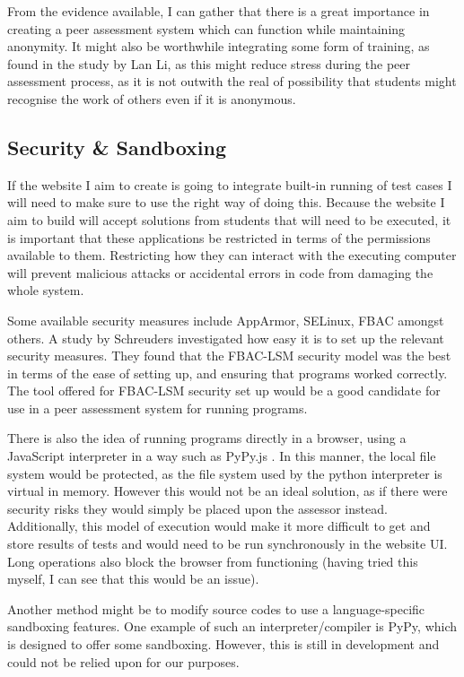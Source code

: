 \documentclass[a4paper,11pt]{report}
\begin{document}
From the evidence available, I can gather that there is a great importance in creating a peer assessment system which can function while maintaining anonymity. It might also be worthwhile integrating some form of training, as found in the study by Lan Li, as this might reduce stress during the peer assessment process, as it is not outwith the real of possibility that students might recognise the work of others even if it is anonymous.

\subsection{Security \& Sandboxing}
If the website I aim to create is going to integrate built-in running of test cases I will need to make sure to use the right way of doing this. Because the website I aim to build will accept solutions from students that will need to be executed, it is important that these applications be restricted in terms of the permissions available to them. Restricting how they can interact with the executing computer will prevent malicious attacks or accidental errors in code from damaging the whole system.\par
Some available security measures include AppArmor, SELinux, FBAC amongst others. A study by Schreuders \cite{schreuders_empowering_2011} investigated how easy it is to set up the relevant security measures. They found that the FBAC-LSM security model was the best in terms of the ease of setting up, and ensuring that programs worked correctly. The tool offered for FBAC-LSM security set up would be a good candidate for use in a peer assessment system for running programs.\par
There is also the idea of running programs directly in a browser, using a JavaScript interpreter in a way such as PyPy.js \cite{pypy.js_web_2016}. In this manner, the local file system would be protected, as the file system used by the python interpreter is virtual in memory. However this would not be an ideal solution, as if there were security risks they would simply be placed upon the assessor instead. Additionally, this model of execution would make it more difficult to get and store results of tests and would need to be run synchronously in the website UI. Long operations also block the browser from functioning (having tried this myself, I can see that this would be an issue).\par
Another method might be to modify source codes to use a language-specific sandboxing features. One example of such an interpreter/compiler is PyPy\cite{pypy_pypy_2016}, which is designed to offer some sandboxing. However, this is still in development and could not be relied upon for our purposes.\par
\end{document}
